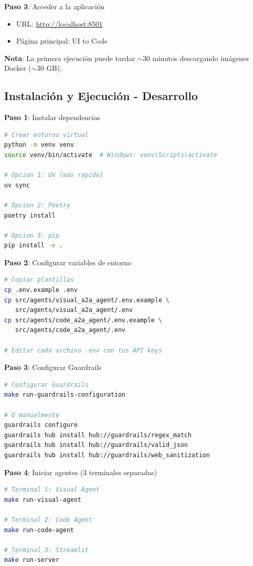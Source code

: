 \documentclass[12pt,a4paper]{article}
\begin{document}
\textbf{Paso 3}: Acceder a la aplicación

\begin{itemize}
    \item URL: \url{http://localhost:8501}
    \item Página principal: UI to Code
\end{itemize}

\textbf{Nota}: La primera ejecución puede tardar $\sim$30 minutos descargando imágenes Docker ($\sim$30 GB).

\subsection{Instalación y Ejecución - Desarrollo}

\textbf{Paso 1}: Instalar dependencias

\begin{lstlisting}[language=bash]
# Crear entorno virtual
python -m venv venv
source venv/bin/activate  # Windows: venv\Scripts\activate

# Opcion 1: UV (mas rapido)
uv sync

# Opcion 2: Poetry
poetry install

# Opcion 3: pip
pip install -e .
\end{lstlisting}

\textbf{Paso 2}: Configurar variables de entorno

\begin{lstlisting}[language=bash]
# Copiar plantillas
cp .env.example .env
cp src/agents/visual_a2a_agent/.env.example \
   src/agents/visual_a2a_agent/.env
cp src/agents/code_a2a_agent/.env.example \
   src/agents/code_a2a_agent/.env

# Editar cada archivo .env con tus API keys
\end{lstlisting}

\textbf{Paso 3}: Configurar Guardrails

\begin{lstlisting}[language=bash]
# Configurar Guardrails
make run-guardrails-configuration

# O manualmente
guardrails configure
guardrails hub install hub://guardrails/regex_match
guardrails hub install hub://guardrails/valid_json
guardrails hub install hub://guardrails/web_sanitization
\end{lstlisting}

\textbf{Paso 4}: Iniciar agentes (3 terminales separadas)

\begin{lstlisting}[language=bash]
# Terminal 1: Visual Agent
make run-visual-agent

# Terminal 2: Code Agent
make run-code-agent

# Terminal 3: Streamlit
make run-server
\end{lstlisting}
\end{document}

